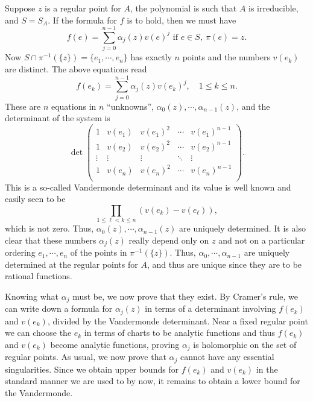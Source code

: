 \documentclass[a4paper,11pt]{article}
\begin{document}
\begin{myproof}
  Suppose $z$ is a regular point for $A$, the polynomial is such that
  $A$ is irreducible, and $S = S_A$.  If the formula for $f$ is to
  hold, then we must have
  $$
  f(e) = \sum_{j=0}^{n-1} \alpha_j(z) v(e)^j \text{ if }e \in S,\ 
  \pi(e) = z.
  $$
  Now $S \cap \pi^{-1}(\{z\}) = \{e_1, \cdots, e_n\}$ has exactly $n$
  points and the numbers $v(e_k)$ are distinct.  The above equations
  read
  $$
  f(e_k) = \sum_{j=0}^{n-1} \alpha_j(z) v(e_k)^j,\quad 1\le k \le n.
  $$
  These are $n$ equations in $n$ ``unknowns'', $\alpha_0(z), \cdots,
  \alpha_{n-1}(z)$, and the determinant of the system is
  $$
  \det
  \begin{pmatrix}
    1 & v(e_1) & v(e_1)^2 & \cdots & v(e_1)^{n-1} \\
    1 & v(e_2) & v(e_2)^2 & \cdots & v(e_2)^{n-1} \\
    \vdots & \vdots & \vdots & \ddots & \vdots \\
    1 & v(e_n) & v(e_n)^2 & \cdots & v(e_n)^{n-1} \\
  \end{pmatrix}.
  $$
  This is a so-called Vandermonde determinant and its value is well
  known and easily seen to be
  $$
  \prod_{1\le \ell < k \le n} (v(e_k) - v(e_\ell)),
  $$
  which is not zero.  Thus, $\alpha_0(z), \cdots, \alpha_{n-1}(z)$ are
  uniquely determined.  It is also clear that these numbers
  $\alpha_j(z)$ really depend only on $z$ and not on a particular
  ordering $e_1, \cdots, e_n$ of the points in $\pi^{-1}(\{z\})$.
  Thus, $\alpha_0, \cdots, \alpha_{n-1}$ are uniquely determined at
  the regular points for $A$, and thus are unique since they are to
  be rational functions.

  Knowing what $\alpha_j$ must be, we now prove that they exist.  By
  Cramer's rule, we can write down a formula for $\alpha_j(z)$ in
  terms of a determinant involving $f(e_k)$ and $v(e_k)$, divided by
  the Vandermonde determinant.  Near a fixed regular point we can
  choose the $e_k$ in terms of charts to be analytic functions and
  thus $f(e_k)$ and $v(e_k)$ become analytic functions, proving
  $\alpha_j$ is holomorphic on the set of regular points.  As usual,
  we now prove that $\alpha_j$ cannot have any essential
  singularities.  Since we obtain upper bounds for $f(e_k)$ and
  $v(e_k)$ in the standard manner we are used to by now, it remains to
  obtain a lower bound for the Vandermonde.


\end{myproof}
\end{document}
